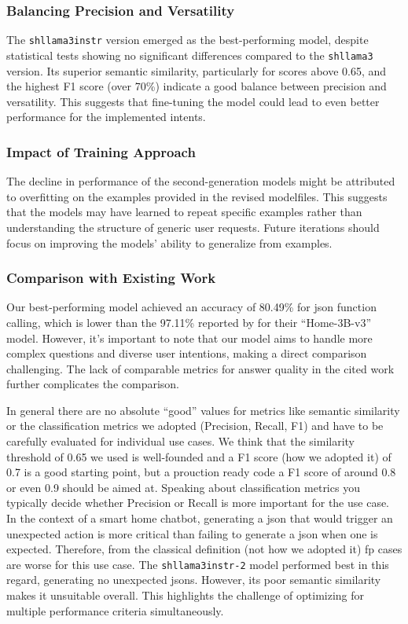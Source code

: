 \subsubsection{Balancing Precision and Versatility}
The \texttt{shllama3instr} version emerged as the best-performing model, despite statistical tests showing no significant differences compared to the \texttt{shllama3} version. Its superior semantic similarity, particularly for scores above 0.65, and the highest F1 score (over 70\%) indicate a good balance between precision and versatility. This suggests that fine-tuning the model could lead to even better performance for the implemented intents.


\subsubsection{Impact of Training Approach}
The decline in performance of the second-generation models might be attributed to overfitting on the examples provided in the revised modelfiles. This suggests that the models may have learned to repeat specific examples rather than understanding the structure of generic user requests. Future iterations should focus on improving the models' ability to generalize from examples.
\subsubsection{Comparison with Existing Work}
Our best-performing model achieved an accuracy of 80.49\% for \gls{json} function calling, which is lower than the 97.11\% reported by \citet{acon96_home_llm} for their ``Home-3B-v3'' model. However, it's important to note that our model aims to handle more complex questions and diverse user intentions, making a direct comparison challenging. The lack of comparable metrics for answer quality in the cited work further complicates the comparison.

In general there are no absolute ``good'' values for metrics like semantic similarity \cite{muhammad2022_similarity} or the classification metrics \cite{yacouby-axman-2020-probabilistic,dasExplainableActivityRecognition2023} we adopted (Precision, Recall, F1) and have to be carefully evaluated for individual use cases.
We think that the similarity threshold of 0.65 we used is well-founded and a F1 score (how we adopted it) of 0.7 is a good starting point, but a prouction ready code a F1 score of around 0.8 or even 0.9 should be aimed at.
Speaking about classification metrics you typically decide whether Precision or Recall is more important for the use case. In the context of a smart home chatbot, generating a \gls{json} that would trigger an unexpected action is more critical than failing to generate a \gls{json} when one is expected. Therefore, from the classical definition (not how we adopted it) \gls{fp} cases are worse for this use case.
The \texttt{shllama3instr-2} model performed best in this regard, generating no unexpected \glspl{json}. 
However, its poor semantic similarity makes it unsuitable overall. This highlights the challenge of optimizing for multiple performance criteria simultaneously.


